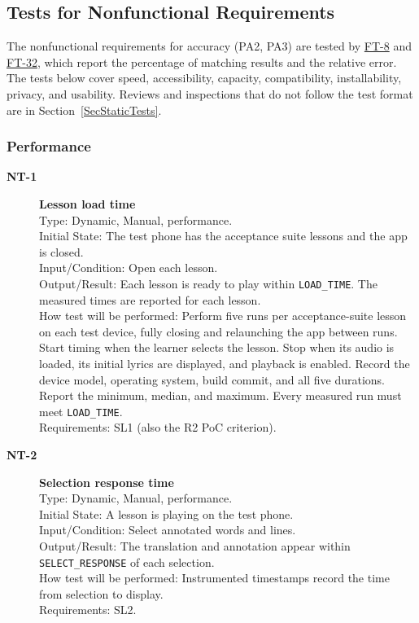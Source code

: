 \documentclass[12pt, titlepage]{article}
\newcommand{\tid}[1]{\hypertarget{test:#1}{\textbf{#1}}}
\newcommand{\tref}[1]{\hyperlink{test:#1}{#1}}
\newcommand{\cn}[1]{\texttt{#1}}
\begin{document}
\subsection{Tests for Nonfunctional Requirements} \label{SecNonfuncTests}

The nonfunctional requirements for accuracy (PA2, PA3) are tested by
\tref{FT-8} and \tref{FT-32}, which report the percentage of matching results
and the relative error. The tests below cover speed, accessibility, capacity,
compatibility, installability, privacy, and usability. Reviews and inspections
that do not follow the test format are in Section~\ref{SecStaticTests}.

\subsubsection{Performance} \label{SecPerfTests}

\begin{description}

\item[\tid{NT-1}] \textbf{Lesson load time}\\
Type: Dynamic, Manual, performance.\\
Initial State: The test phone has the acceptance suite lessons and the app is
closed.\\
Input/Condition: Open each lesson.\\
Output/Result: Each lesson is ready to play within \cn{LOAD\_TIME}. The measured
times are reported for each lesson.\\
How test will be performed: Perform five runs per acceptance-suite lesson
on each test device, fully closing and relaunching the app between runs.
Start timing when the learner selects the lesson. Stop when its audio is
loaded, its initial lyrics are displayed, and playback is enabled.
Record the device model, operating system, build commit, and all five
durations. Report the minimum, median, and maximum. Every measured run
must meet \cn{LOAD\_TIME}.\\
Requirements: SL1 (also the R2 PoC criterion).

\item[\tid{NT-2}] \textbf{Selection response time}\\
Type: Dynamic, Manual, performance.\\
Initial State: A lesson is playing on the test phone.\\
Input/Condition: Select annotated words and lines.\\
Output/Result: The translation and annotation appear within
\cn{SELECT\_RESPONSE} of each selection.\\
How test will be performed: Instrumented timestamps record the time from
selection to display.\\
Requirements: SL2.

\end{description}
\end{document}
